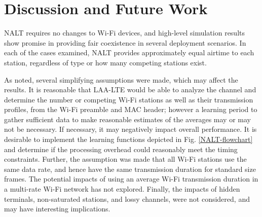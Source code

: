\section{Discussion and Future Work}
\label{future-work}
NALT requires no changes to \mbox{\mbox{Wi-Fi}} devices, and high-level simulation results show promise in providing fair coexistence in several deployment scenarios.  In each of the cases examined, NALT provides approximately equal airtime to each station, regardless of type or how many competing stations exist.  

As noted, several simplifying assumptions were made, which may affect the results.  It is reasonable that \mbox{\mbox{LAA-LTE}} would be able to analyze the channel and determine the number or competing \mbox{\mbox{Wi-Fi}} stations as well as their transmission profiles, from the \mbox{\mbox{Wi-Fi}} preamble and MAC header; however a learning period to gather sufficient data to make reasonable estimates of the averages may or may not be necessary.  If necessary, it may negatively impact overall performance. It is desirable to implement the learning functions depicted in Fig. \ref{NALT-flowchart} and determine if the processing overhead could reasonably meet the timing constraints. Further, the assumption was made that all \mbox{\mbox{Wi-Fi}} stations use the same data rate, and hence have the same transmission duration for standard size frames.  The potential impacts of using an average \mbox{\mbox{Wi-Fi}} transmission duration in a multi-rate \mbox{\mbox{Wi-Fi}} network has not explored.   Finally, the impacts of hidden terminals, non-saturated stations, and lossy channels, were not considered, and may have interesting implications. 

